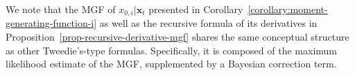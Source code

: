 %
%
\begin{remark}
    We note that the MGF of ${x}_{0,i}\vert\mathbf{x}_{t}$ presented in Corollary~\ref{corollary:moment-generating-function-i} as well as the recursive formula of its derivatives in Proposition~\ref{prop-recursive-derivative-mgf} shares the same conceptual structure as other Tweedie's-type formulas. Specifically, it is composed of the maximum likelihood estimate of the MGF, supplemented by a Bayesian correction term. 
\end{remark}
